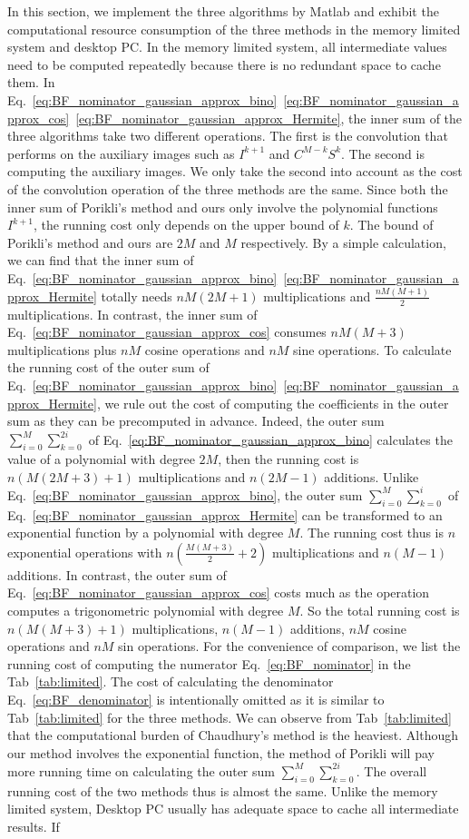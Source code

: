 \documentclass[twocolumn]{el-author}
\begin{document}
In this section, we implement the three algorithms by Matlab and exhibit the computational resource consumption of the three methods in the memory limited system and desktop PC. In the memory limited system, all intermediate values need to be computed repeatedly because there is no redundant space to cache them. In Eq.~\eqref{eq:BF_nominator_gaussian_approx_bino}~\eqref{eq:BF_nominator_gaussian_approx_cos}~\eqref{eq:BF_nominator_gaussian_approx_Hermite}, the inner sum of the three algorithms take two different operations. The first is the convolution that performs on the auxiliary images such as $I^{k+1}$ and $C^{M-k}S^k$. The second is computing the auxiliary images. We only take the second into account as the cost of the convolution operation of the three methods are the same. Since both the inner sum of Porikli's method and ours only involve the polynomial functions $I^{k+1}$, the running cost only depends on the upper bound of $k$. The bound of Porikli's method and ours are $2M$ and $M$ respectively. By a simple calculation, we can find that the inner sum of Eq.~\eqref{eq:BF_nominator_gaussian_approx_bino}~\eqref{eq:BF_nominator_gaussian_approx_Hermite} totally needs $n M (2M+1)$ multiplications and $\frac{n M (M+1)}{2}$ multiplications. In contrast, the inner sum of Eq.~\eqref{eq:BF_nominator_gaussian_approx_cos} consumes $n M (M+3)$ multiplications plus $nM$ cosine operations and  $nM$ sine operations. To calculate the running cost of the outer sum of Eq.~\eqref{eq:BF_nominator_gaussian_approx_bino}~\eqref{eq:BF_nominator_gaussian_approx_Hermite},   we rule out the cost of computing the coefficients in the outer sum as they can be precomputed in advance. Indeed, the outer sum $\sum_{i=0}^M \sum_{k=0}^{2i}$ of Eq.~\eqref{eq:BF_nominator_gaussian_approx_bino} calculates the value of a polynomial with degree $2M$, then the running cost is $n(M(2M+3)+1)$ multiplications and $n(2M-1)$ additions. Unlike Eq.~\eqref{eq:BF_nominator_gaussian_approx_bino}, the outer sum $\sum_{i=0}^M \sum_{k=0}^{i}$ of Eq.~\eqref{eq:BF_nominator_gaussian_approx_Hermite} can be transformed to an exponential function by a polynomial with degree $M$. The running cost thus is $n$ exponential operations with $n(\frac{M(M+3)}{2}+2)$ multiplications and $n(M-1)$ additions. In contrast, the outer sum of Eq.~\eqref{eq:BF_nominator_gaussian_approx_cos} costs much as the operation computes a trigonometric polynomial with degree $M$. So the total running cost is $n(M(M+3)+1)$ multiplications, $n(M-1)$ additions, $nM$ cosine operations and $nM$ sin operations. For the convenience of comparison, we list the running cost of computing the numerator Eq.~\eqref{eq:BF_nominator} in the Tab~\ref{tab:limited}.  The cost of calculating the denominator Eq.~\eqref{eq:BF_denominator} is intentionally omitted as it is similar to Tab~\ref{tab:limited} for the three methods. We can observe from Tab~\ref{tab:limited} that the computational burden of Chaudhury's method is the heaviest. Although our method involves the exponential function, the method of Porikli will pay more running time on calculating the outer sum $\sum_{i=0}^M \sum_{k=0}^{2i}$. The overall running cost of the two methods thus is almost the same. Unlike the memory limited system, Desktop PC usually has adequate space to cache all intermediate results. If 
\end{document}

